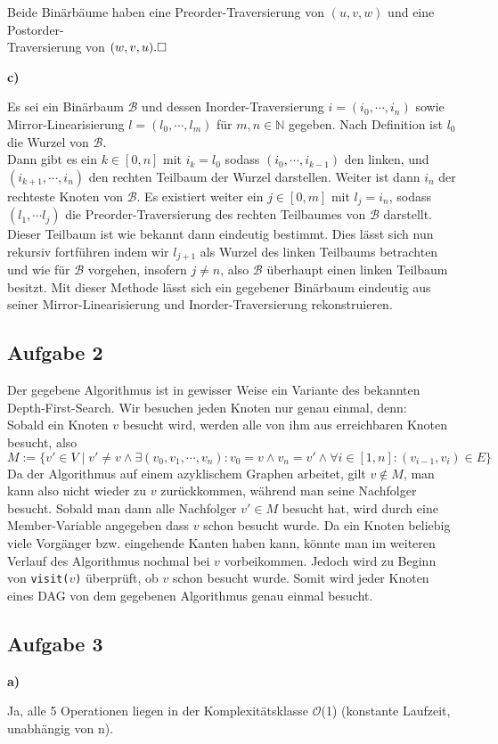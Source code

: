 \documentclass[a4paper,graphics,11pt]{article}
\newcommand{\aufgabe}[1]{\subsection*{Aufgabe #1}}
\begin{document}
Beide Binärbäume haben eine Preorder-Traversierung von $(u, v, w)$ und eine Postorder-\\
Traversierung von $(w, v, u).\hfill\square$

\textbf{c)}

Es sei ein Binärbaum $\mathcal{B}$ und dessen Inorder-Traversierung $i = (i_0, \cdots, i_n)$ sowie
Mirror-Linearisierung $l = (l_0, \cdots, l_m)$ für $m,n \in \mathbb{N}$ gegeben.
Nach Definition ist $l_0$ die Wurzel von $\mathcal{B}$.\\
Dann gibt es ein $k \in [0,n]$ mit $i_k = l_0$ sodass $(i_0, \cdots, i_{k-1})$
den linken, und $(i_{k+1},\cdots, i_n)$ den rechten Teilbaum der Wurzel darstellen. Weiter ist dann $i_n$ der
rechteste Knoten von $\mathcal{B}$. Es existiert weiter ein $j \in [0, m]$ mit $l_j = i_n$, sodass $(l_1, \cdots l_j)$
die Preorder-Traversierung des rechten Teilbaumes von $\mathcal{B}$ darstellt. Dieser Teilbaum ist wie bekannt
dann eindeutig bestimmt. Dies lässt sich nun rekursiv fortführen indem wir $l_{j+1}$ als Wurzel des linken Teilbaums
betrachten und wie für $\mathcal{B}$ vorgehen, insofern $j \neq n$, also $\mathcal{B}$ überhaupt einen linken
Teilbaum besitzt. Mit dieser Methode lässt sich ein gegebener Binärbaum eindeutig aus seiner Mirror-Linearisierung
und Inorder-Traversierung rekonstruieren.

\newpage
\aufgabe{2}
Der gegebene Algorithmus ist in gewisser Weise ein Variante des bekannten Depth-First-Search.
Wir besuchen jeden Knoten nur genau einmal, denn:\\
Sobald ein Knoten $v$ besucht wird, werden alle von ihm aus erreichbaren Knoten besucht, also
$$
M := \{v' \in V \mid v' \neq v \land \exists (v_0, v_1, \cdots, v_n) : v_0 = v \land v_n = v' \land \forall i \in [1,n] : (v_{i-1}, v_i) \in E\}
$$
Da der Algorithmus auf einem azyklischem Graphen arbeitet, gilt $v \notin M$, man kann also nicht wieder zu $v$
zurückkommen, während man seine Nachfolger besucht. Sobald man dann alle Nachfolger $v' \in M$ besucht hat,
wird durch eine Member-Variable angegeben dass $v$ schon besucht wurde. Da ein Knoten beliebig viele Vorgänger
bzw. eingehende Kanten haben kann, könnte man im weiteren Verlauf des Algorithmus nochmal bei $v$ vorbeikommen.
Jedoch wird zu Beginn von \texttt{visit($v$)} überprüft, ob $v$ schon besucht wurde. Somit wird jeder Knoten eines DAG
von dem gegebenen Algorithmus genau einmal besucht.

\aufgabe{3}
\textbf{a)}

Ja, alle 5 Operationen liegen in der Komplexitätsklasse $\mathcal{O}$(1) (konstante Laufzeit, unabhängig von n).
\end{document}
